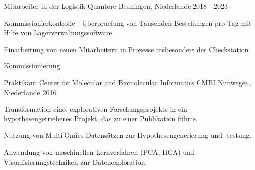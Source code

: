 

\begin{cventries}

  \cventry
    {Mitarbeiter in der Logistik} %
    {Quantore} %
    {Beuningen, Niederlande} %
    {2018 - 2023} %
    {
      \begin{cvitems} %
        \item {Kommissionierkontrolle - Überpruefung von Tausenden Bestellungen pro Tag mit Hilfe von Lagerverwaltungssoftware}
        \item {Einarbeitung von neuen Mitarbeitern in Prozesse insbesondere der Checkstation}
        \item {Kommissionierung}
        \vspace{0.2cm}
        \newline{}  
      \end{cvitems}
    }

  \cventry
    {Praktikant} %
    {Center for Molecular and Biomolecular Informatics CMBI} %
    {Nimwegen, Niederlande} %
    {2016} %
    {
      \begin{cvitems} %
        \item {Transformation eines explorativen Forschungsprojekts in ein hypothesengetriebenes Projekt, das zu einer Publikation führte.}
        \item {Nutzung von Multi-Omics-Datensätzen zur Hypothesengenerierung und -testung.}
        \item {Anwendung von maschinellen Lernverfahren (PCA, HCA) und Visualisierungstechniken zur Datenexploration.}
        \vspace{0.2cm}
        \newline{}    
          
      \end{cvitems}
    }


\end{cventries}
